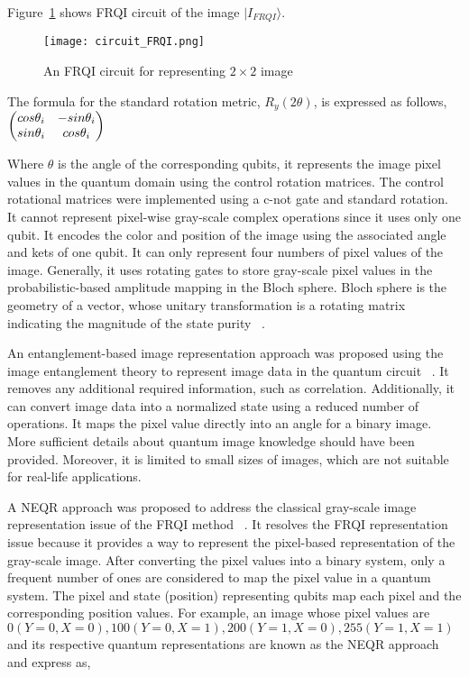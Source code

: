 Figure~\ref{FRQI_Circuit} shows FRQI circuit of the image $|I_{FRQI}\rangle$.  

\begin{figure}[t!]
\centerline{\texttt{[image: circuit\_FRQI.png]}}
\caption{An FRQI circuit for representing $2\times2$ image}
\label{FRQI_Circuit}
\end{figure}

The formula for the standard rotation metric, $R_y(2\theta)$, is expressed as follows, 
$\begin{pmatrix}
\centering
  cos\theta_i & -sin\theta_i \\ 
  sin\theta_i & cos\theta_i
\end{pmatrix}$ 

Where $\theta$ is the angle of the corresponding qubits, it represents the image pixel values in the quantum domain using the control rotation matrices. The control rotational matrices were implemented using a c-not gate and standard rotation. It cannot represent pixel-wise gray-scale complex operations since it uses only one qubit. It encodes the color and position of the image using the associated angle and kets of one qubit. It can only represent four numbers of pixel values of the image. Generally, it uses rotating gates to store gray-scale pixel values in the probabilistic-based amplitude mapping in the Bloch sphere. Bloch sphere is the geometry of a vector, whose unitary transformation is a rotating matrix indicating the magnitude of the state purity ~\cite{gamel2016entangled}. 

An entanglement-based image representation approach was proposed using the image entanglement theory to represent image data in the quantum circuit ~\cite{b14}. It removes any additional required information, such as correlation. Additionally, it can convert image data into a normalized state using a reduced number of operations. It maps the pixel value directly into an angle for a binary image. More sufficient details about quantum image knowledge should have been provided. Moreover, it is limited to small sizes of images, which are not suitable for real-life applications.

A NEQR approach was proposed to address the classical gray-scale image representation issue of the FRQI method ~\cite{bb10}. It resolves the FRQI representation issue because it provides a way to represent the pixel-based representation of the gray-scale image. After converting the pixel values into a binary system, only a frequent number of ones are considered to map the pixel value in a quantum system. The pixel and state (position) representing qubits map each pixel and the corresponding position values. For example, an image whose pixel values are $0 (Y=0, X=0), 100 (Y=0, X=1), 200 (Y=1, X=0), 255 (Y=1, X=1)$ and its respective quantum representations are known as the NEQR approach and express as,


